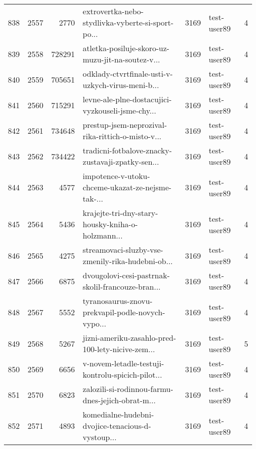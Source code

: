 \begin{tabular}{lrrlrlr}
838  &       2557 &     2770 &  extrovertka-nebo-stydlivka-vyberte-si-sport-po... &     3169 &                  test-user89 &               4 \\
839  &       2558 &   728291 &  atletka-posiluje-skoro-uz-muzu-jit-na-soutez-v... &     3169 &                  test-user89 &               4 \\
840  &       2559 &   705651 &  odklady-ctvrtfinale-usti-v-uzkych-virus-meni-b... &     3169 &                  test-user89 &               4 \\
841  &       2560 &   715291 &  levne-ale-plne-dostacujici-vyzkouseli-jsme-chy... &     3169 &                  test-user89 &               4 \\
842  &       2561 &   734648 &  prestup-jsem-neprozival-rika-rittich-o-misto-v... &     3169 &                  test-user89 &               4 \\
843  &       2562 &   734422 &  tradicni-fotbalove-znacky-zustavaji-zpatky-sen... &     3169 &                  test-user89 &               4 \\
844  &       2563 &     4577 &  impotence-v-utoku-chceme-ukazat-ze-nejsme-tak-... &     3169 &                  test-user89 &               4 \\
845  &       2564 &     5436 &  krajejte-tri-dny-stary-housky-kniha-o-holzmann... &     3169 &                  test-user89 &               4 \\
846  &       2565 &     4275 &  streamovaci-sluzby-vse-zmenily-rika-hudebni-ob... &     3169 &                  test-user89 &               4 \\
847  &       2566 &     6875 &  dvougolovi-cesi-pastrnak-skolil-francouze-bran... &     3169 &                  test-user89 &               4 \\
848  &       2567 &     5552 &  tyranosaurus-znovu-prekvapil-podle-novych-vypo... &     3169 &                  test-user89 &               4 \\
849  &       2568 &     5267 &  jizni-ameriku-zasahlo-pred-100-lety-nicive-zem... &     3169 &                  test-user89 &               5 \\
850  &       2569 &     6656 &  v-novem-letadle-testuji-kontrolu-spicich-pilot... &     3169 &                  test-user89 &               4 \\
851  &       2570 &     6823 &  zalozili-si-rodinnou-farmu-dnes-jejich-obrat-m... &     3169 &                  test-user89 &               4 \\
852  &       2571 &     4893 &  komedialne-hudebni-dvojice-tenacious-d-vystoup... &     3169 &                  test-user89 &               4 \\

\end{tabular}
